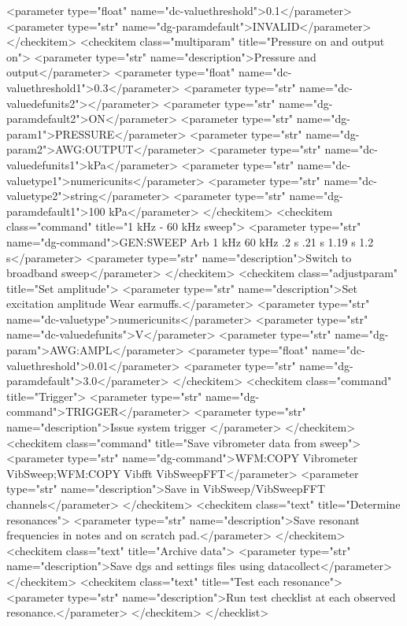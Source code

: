 \documentclass{QAstatement}
\begin{document}
{        <parameter type="float" name="dc-valuethreshold">0.1</parameter>
        <parameter type="str" name="dg-paramdefault">INVALID</parameter>
    </checkitem>
    <checkitem class="multiparam" title="Pressure on and output on">
        <parameter type="str" name="description">Pressure and output</parameter>
        <parameter type="float" name="dc-valuethreshold1">0.3</parameter>
        <parameter type="str" name="dc-valuedefunits2"></parameter>
        <parameter type="str" name="dg-paramdefault2">ON</parameter>
        <parameter type="str" name="dg-param1">PRESSURE</parameter>
        <parameter type="str" name="dg-param2">AWG:OUTPUT</parameter>
        <parameter type="str" name="dc-valuedefunits1">kPa</parameter>
        <parameter type="str" name="dc-valuetype1">numericunits</parameter>
        <parameter type="str" name="dc-valuetype2">string</parameter>
        <parameter type="str" name="dg-paramdefault1">100 kPa</parameter>
    </checkitem>
    <checkitem class="command" title="1 kHz - 60 kHz sweep">
        <parameter type="str" name="dg-command">GEN:SWEEP Arb 1 kHz 60 kHz .2 s .21 s 1.19 s 1.2 s</parameter>
        <parameter type="str" name="description">Switch to broadband sweep</parameter>
    </checkitem>
    <checkitem class="adjustparam" title="Set amplitude">
        <parameter type="str" name="description">Set excitation amplitude
Wear earmuffs.</parameter>
        <parameter type="str" name="dc-valuetype">numericunits</parameter>
        <parameter type="str" name="dc-valuedefunits">V</parameter>
        <parameter type="str" name="dg-param">AWG:AMPL</parameter>
        <parameter type="float" name="dc-valuethreshold">0.01</parameter>
        <parameter type="str" name="dg-paramdefault">3.0</parameter>
    </checkitem>
    <checkitem class="command" title="Trigger">
        <parameter type="str" name="dg-command">TRIGGER</parameter>
        <parameter type="str" name="description">Issue system trigger </parameter>
    </checkitem>
    <checkitem class="command" title="Save vibrometer data from sweep">
        <parameter type="str" name="dg-command">WFM:COPY Vibrometer VibSweep;WFM:COPY Vibfft VibSweepFFT</parameter>
        <parameter type="str" name="description">Save in VibSweep/VibSweepFFT channels</parameter>
    </checkitem>
    <checkitem class="text" title="Determine resonances">
        <parameter type="str" name="description">Save resonant frequencies in notes and on scratch pad.</parameter>
    </checkitem>
    <checkitem class="text" title="Archive data">
        <parameter type="str" name="description">Save dgs and settings files using datacollect</parameter>
    </checkitem>
    <checkitem class="text" title="Test each resonance">
        <parameter type="str" name="description">Run test checklist at each observed resonance.</parameter>
    </checkitem>
</checklist>
}
\end{document}
